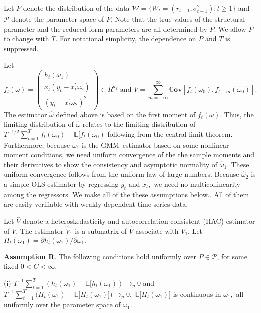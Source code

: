 \documentclass[11pt]{article}
\begin{document}
Let $P$ denote the distribution of the data $\mathcal{W}=\{W_{t}=(r_{t+1},%
\sigma _{t+1}^{2}):t\geq 1\}$ and $\mathcal{P}$ denote the parameter space
of $P$. Note that the true values of the structural parameter and the
reduced-form parameters are all determined by $P.$ We allow $P$ to change
with $T.$ For notational simplicity, the dependence on $P$ and $T$ is
suppressed.

Let 
\begin{equation}
f_{t}(\omega )=\left( 
\begin{array}{c}
h_{t}(\omega _{1}) \\ 
x_{t}(y_{t}-x_{t}^{\prime }\omega _{2}) \\ 
(y_{t}-x_{t}^{\prime }\omega _{2})^{2}%
\end{array}%
\right) \in R^{d_{f}}\text{ and }V=\sum_{m=-\infty }^{\infty }\mathbb{C}%
\mathbf{ov}[f_{t}(\omega _{0}),f_{t+m}(\omega _{0})].
\end{equation}%
The estimator $\widehat{\omega }$ defined above is based on the first moment
of $f_{t}(\omega ).$ Thus, the limiting distribution of $\widehat{\omega }$
relates to the limiting distribution of $T^{-1/2}\sum_{t=1}^{T}f_{t}(\omega
_{0})-\mathbb{E[}f_{t}(\omega _{0})$ following from the central limit
theorem. Furthermore, because $\omega _{1}$ is the GMM\ estimator based on
some nonlinear moment conditions, we need uniform convergence of the the
sample moments and their derivatives to show the consistency and asymptotic
normality of $\widehat{\omega }_{1}.$ These uniform convergence follows from
the uniform law of large numbers. Because $\widehat{\omega }_{2}$ is a
simple OLS estimator by regressing $y_{t}$ and $x_{t},$ we need
no-multicollinearity among the regressors. We make all of the these
assumptions below.. All of them are easily verifiable with weakly dependent
time series data.

Let $\widehat{V}$ denote a heteroskedasticity and autocorrelation consistent
(HAC) estimator of $V$. The estimator $\widehat{V}_{1}$ is a submatrix of $%
\widehat{V}$ associate with $V_{1}.$ Let $H_{t}(\omega _{1})=\partial
h_{t}(\omega _{1})/\partial \omega _{1}^{\prime }.$

\smallskip

\noindent \textbf{Assumption R}. The following conditions hold uniformly
over $P\in \mathcal{P}$, for some fixed $0<C<\infty .$

\noindent (i) $T^{-1}\sum_{t=1}^{T}(h_{t}(\omega _{1})-\mathbb{E[}%
h_{t}(\omega _{1}))\rightarrow _{p}0$ and $T^{-1}\sum_{t=1}^{T}(H_{t}(\omega
_{1})-\mathbb{E[}H_{t}(\omega _{1})\mathbb{])}\rightarrow _{p}0,$ $\mathbb{E[%
}H_{t}(\omega _{1})\mathbb{]}$ is continuous in $\omega _{1},$ all uniformly
over the parameter space of $\omega _{1}.$
\end{document}
